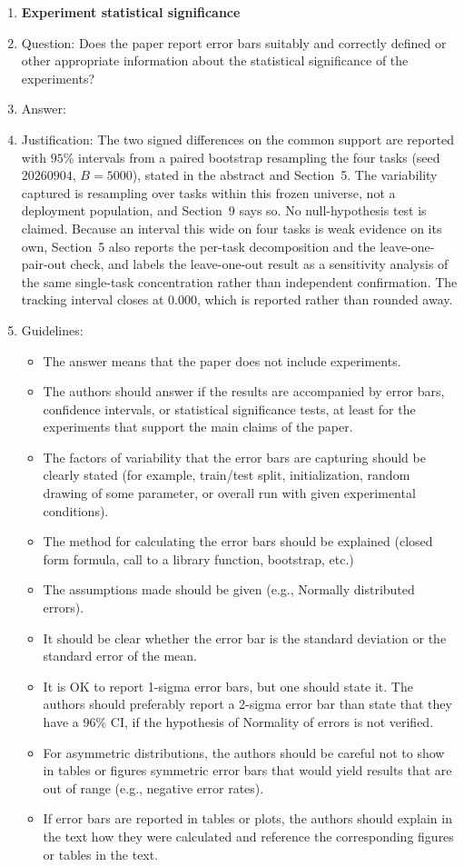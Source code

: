 \begin{enumerate}
\item {\bf Experiment statistical significance}
    \item[] Question: Does the paper report error bars suitably and correctly defined or other appropriate information about the statistical significance of the experiments?
    \item[] Answer: \answerYes{}
    \item[] Justification: The two signed differences on the common support are reported with $95\%$ intervals from a paired bootstrap resampling the four tasks (seed $20260904$, $B=5000$), stated in the abstract and Section~5. The variability captured is resampling over tasks within this frozen universe, not a deployment population, and Section~9 says so. No null-hypothesis test is claimed. Because an interval this wide on four tasks is weak evidence on its own, Section~5 also reports the per-task decomposition and the leave-one-pair-out check, and labels the leave-one-out result as a sensitivity analysis of the same single-task concentration rather than independent confirmation. The tracking interval closes at $0.000$, which is reported rather than rounded away.
    \item[] Guidelines:
    \begin{itemize}
        \item The answer \answerNA{} means that the paper does not include experiments.
        \item The authors should answer \answerYes{} if the results are accompanied by error bars, confidence intervals, or statistical significance tests, at least for the experiments that support the main claims of the paper.
        \item The factors of variability that the error bars are capturing should be clearly stated (for example, train/test split, initialization, random drawing of some parameter, or overall run with given experimental conditions).
        \item The method for calculating the error bars should be explained (closed form formula, call to a library function, bootstrap, etc.)
        \item The assumptions made should be given (e.g., Normally distributed errors).
        \item It should be clear whether the error bar is the standard deviation or the standard error of the mean.
        \item It is OK to report 1-sigma error bars, but one should state it. The authors should preferably report a 2-sigma error bar than state that they have a 96\% CI, if the hypothesis of Normality of errors is not verified.
        \item For asymmetric distributions, the authors should be careful not to show in tables or figures symmetric error bars that would yield results that are out of range (e.g., negative error rates).
        \item If error bars are reported in tables or plots, the authors should explain in the text how they were calculated and reference the corresponding figures or tables in the text.
    \end{itemize}


\end{enumerate}
